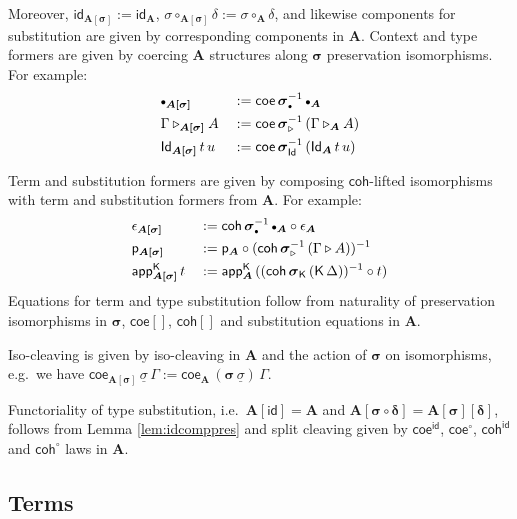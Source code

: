 \documentclass{article}
\theoremstyle{definition}
\theoremstyle{theorem}
\newcommand{\id}{\mathsf{id}}
\newcommand{\Id}{\mathsf{Id}}
\newcommand{\ext}{\triangleright}
\newcommand{\emptycon}{\scaleobj{.75}\bullet}
\newcommand{\p}{\mathsf{p}}
\newcommand{\K}{\mathsf{K}}
\newcommand{\appK}{\mathsf{app}^{\K}}
\newcommand{\bsigma}{\boldsymbol{\sigma}}
\newcommand{\bA}{\boldsymbol{A}}
\newcommand{\ul}[1]{\underline{#1}}
\newcommand{\ulsigma}{\ul{\sigma}}
\newcommand{\coe}{\mathsf{coe}}
\newcommand{\coh}{\mathsf{coh}}
\begin{document}
Moreover, $\id_{\boldsymbol{A[\sigma]}} := \id_{\bA}$,
$\sigma\circ_{\boldsymbol{A[\sigma]}}\delta := \sigma\circ_{\bA}\delta$, and
likewise components for substitution are given by corresponding components in
$\bA$. Context and type formers are given by coercing $\bA$
structures along $\bsigma$ preservation isomorphisms. For example:
\begin{alignat*}{3}
  &\emptycon_{\boldsymbol{A[\sigma]}} && :=
    \coe\,\bsigma_{\emptycon}^{-1}\,\emptycon_{\bA}\\
  &\Gamma\ext_{\boldsymbol{A[\sigma]}}A && :=
    \coe\,\bsigma_{\ext}^{-1}\,(\Gamma\ext_{\bA} A)\\
  &\Id_{\boldsymbol{A[\sigma]}}\,t\,u && :=
    \coe\,\bsigma_{\Id}^{-1}\,(\Id_{\bA}\,t\,u)
\end{alignat*}

Term and substitution formers are given by composing $\coh$-lifted
isomorphisms with term and substitution formers from $\bA$. For example:
\begin{alignat*}{3}
  & \epsilon_{\boldsymbol{A[\sigma]}} && :=
    \coh\,\bsigma_{\emptycon}^{-1}\,\emptycon_{\bA} \circ \epsilon_{\bA}\\
  & \p_{\boldsymbol{A[\sigma]}} && :=
    \p_{\bA} \circ (\coh\,\bsigma_{\ext}^{-1}\,(\Gamma\ext A))^{-1}\\
  & \appK_{\boldsymbol{A[\sigma]}}\,t && :=
    \appK_{\bA}\,((\coh\,\bsigma_{\K}\,(\K\,\Delta))^{-1}\circ t)
\end{alignat*}
Equations for term and type substitution follow from naturality of preservation
isomorphisms in $\bsigma$, $\coe[]$, $\coh[]$ and substitution equations in
$\bA$.

Iso-cleaving is given by iso-cleaving in $\bA$ and the action of $\bsigma$ on
isomorphisms, e.g.\ we have $\coe_{\boldsymbol{A[\sigma]}}\,\ulsigma\,\Gamma
:= \coe_{\bA}\,(\bsigma\,\ulsigma)\,\Gamma$.

Functoriality of type substitution, i.e.\ $\boldsymbol{A[\id]} = \bA$ and
$\boldsymbol{A[\sigma\circ\delta]} = \boldsymbol{A[\sigma][\delta]}$, follows
from Lemma \ref{lem:idcomppres} and split cleaving given by $\coe^{\id}$,
$\coe^{\circ}$, $\coh^{\id}$ and $\coh^{\circ}$ laws in $\bA$.

\subsection{Terms}
\end{document}
